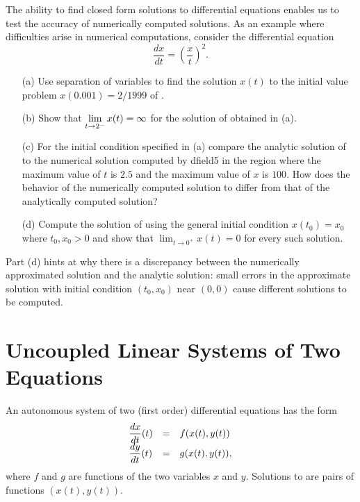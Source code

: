 \begin{exercise} \label{c14.1.18}
The ability to find closed form solutions to differential equations enables
us to test the accuracy of numerically computed solutions.  As an example where difficulties arise in numerical computations, consider the differential 
equation
\begin{equation} \label{eq:exivp}
\frac{dx}{dt} = \left(\frac{x}{t}\right)^2.
\end{equation}
\begin{itemize}
\item[(a)] Use separation of variables to find the solution $x(t)$ to the 
initial value problem $x(0.001) = 2/1999$ of .
\item[(b)] Show that $\displaystyle\lim_{t\to 2^-}x(t)=\infty$ for the solution of 
 obtained in (a).
\item[(c)] For the initial condition specified in (a) compare the analytic 
solution of  to the numerical solution computed by {\sf dfield5} 
in the region where the maximum value of $t$ is $2.5$ and the maximum value of 
$x$ is $100$.  How does the behavior of the numerically computed solution 
to  differ from that of the analytically computed solution?
\item[(d)]  Compute the solution of  using the general initial 
condition $x(t_0) = x_0$ where $t_0,x_0>0$ and show that 
$\lim_{t\to 0^+}x(t)=0$ for every such solution. 
\end{itemize}
 Part (d) hints at why there is a discrepancy 
between the numerically approximated solution and the analytic solution: 
small errors in the approximate solution with initial condition $(t_0,x_0)$ 
near $(0,0)$ cause different solutions to be computed.
\end{exercise}

 

\section{Uncoupled Linear Systems of Two Equations}
\label{sec:UncoupledLS}

An autonomous system of two (first order) 
differential equations 
has the form
\renewcommand{\arraystretch}{1.8}
\begin{equation} \label{e:aut2}
\begin{array}{lll}
\displaystyle \frac{dx}{dt}(t)  & = & f(x(t),y(t)) \\
\displaystyle \frac{dy}{dt}(t)  & = & g(x(t),y(t)),
\end{array}
\end{equation}
where $f$ and $g$ are functions of the two variables $x$
and $y$.  Solutions to  are pairs of functions
$(x(t),y(t))$.

